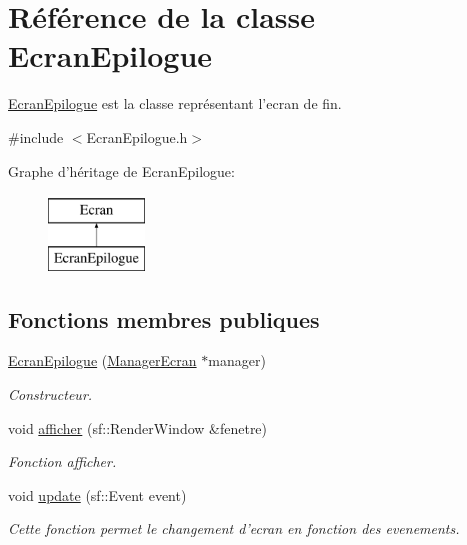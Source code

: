 \hypertarget{classEcranEpilogue}{\section{\-Référence de la classe \-Ecran\-Epilogue}
\label{classEcranEpilogue}
}


\hyperlink{classEcranEpilogue}{\-Ecran\-Epilogue} est la classe représentant l'ecran de fin.  




{\ttfamily \#include $<$\-Ecran\-Epilogue.\-h$>$}

\-Graphe d'héritage de \-Ecran\-Epilogue\-:\begin{figure}[H]
\begin{center}
\leavevmode
\includegraphics[height=2.000000cm]{classEcranEpilogue}
\end{center}
\end{figure}
\subsection*{\-Fonctions membres publiques}
\begin{DoxyCompactItemize}
\item 
\hypertarget{classEcranEpilogue_a6fca8536eefc58e5f4e28e6da0742384}{\hyperlink{classEcranEpilogue_a6fca8536eefc58e5f4e28e6da0742384}{\-Ecran\-Epilogue} (\hyperlink{classManagerEcran}{\-Manager\-Ecran} $\ast$manager)}\label{classEcranEpilogue_a6fca8536eefc58e5f4e28e6da0742384}

\begin{DoxyCompactList}\small\item\em \-Constructeur. \end{DoxyCompactList}\item 
void \hyperlink{classEcranEpilogue_adc329838b8e9dedbf436396b44e10ac7}{afficher} (sf\-::\-Render\-Window \&fenetre)
\begin{DoxyCompactList}\small\item\em \-Fonction afficher. \end{DoxyCompactList}\item 
void \hyperlink{classEcranEpilogue_a4398f6b82b14fa43f9581b7d37206e20}{update} (sf\-::\-Event event)
\begin{DoxyCompactList}\small\item\em \-Cette fonction permet le changement d'ecran en fonction des evenements. \end{DoxyCompactList}\end{DoxyCompactItemize}


